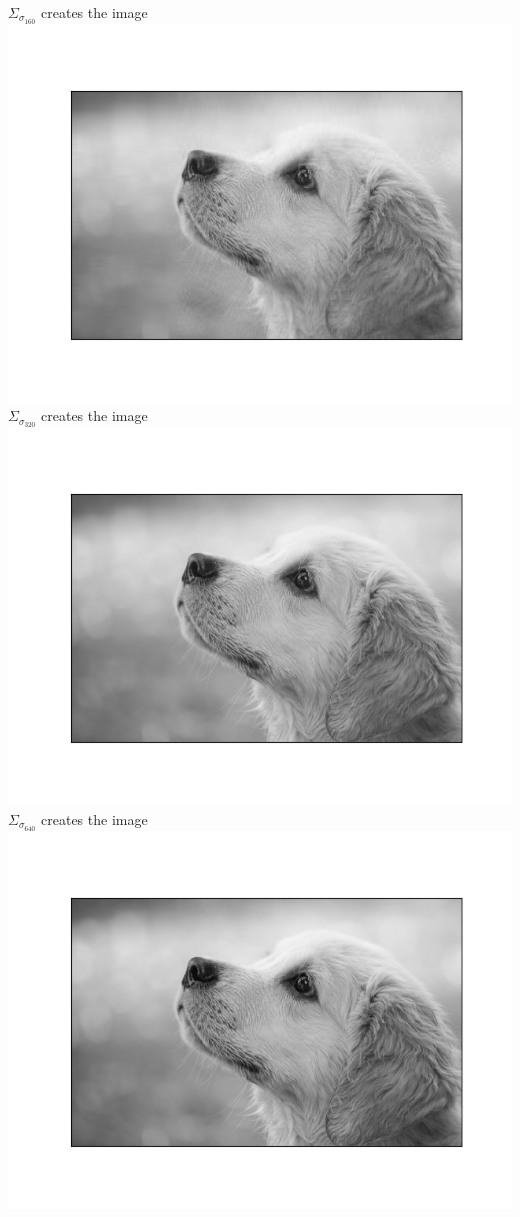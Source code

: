 \documentclass[12pt]{article}
\begin{document}
		$\Sigma_{\sigma_{160}}$ creates the image \\
		\includegraphics[scale=0.8]{part1/prob_a/Figure_4} \\
\newpage
		$\Sigma_{\sigma_{320}}$ creates the image \\
		\includegraphics[scale=0.8]{part1/prob_a/Figure_5} \\
		$\Sigma_{\sigma_{640}}$ creates the image \\
		\includegraphics[scale=0.8]{part1/prob_a/Figure_6} \\
\end{document}
